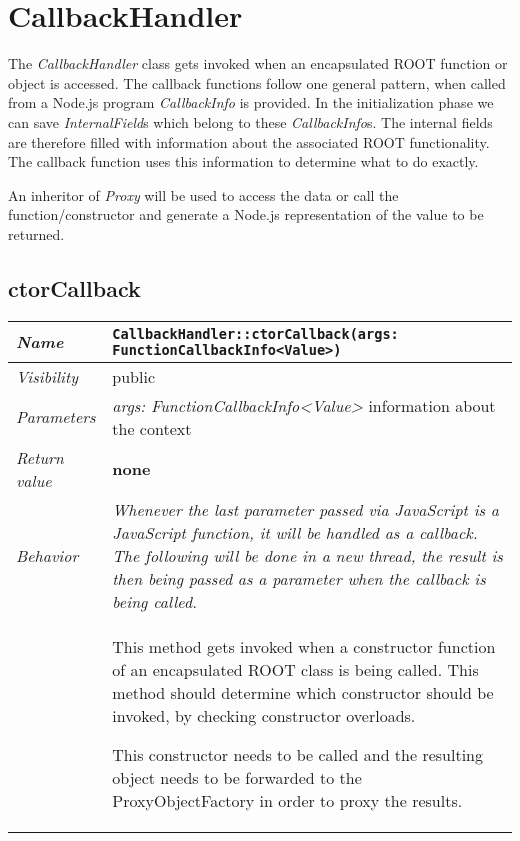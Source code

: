 \chapter{CallbackHandler}
The \textit{CallbackHandler} class gets invoked when an encapsulated ROOT function or object is accessed.
The callback functions follow one general pattern, when called from a Node.js program \textit{CallbackInfo} is provided.
In the initialization phase we can save \textit{InternalField}s which belong to these \textit{CallbackInfo}s.
The internal fields are therefore filled with information about the associated ROOT functionality.
The callback function uses this information to determine what to do exactly.

An inheritor of \textit{Proxy} will be used to access the data or call the function/constructor and generate a Node.js representation of the value to be returned.
\section{ctorCallback}
\begin{longtable}{p{3cm} @{\hskip 1cm} p{12cm}}
 \hline
\textit{Name} & \texttt{CallbackHandler::ctorCallback(args: FunctionCallbackInfo<Value>)}\\
\hline
 \textit{Visibility} & public\\
\hline
\textit{Parameters} & \textit{args: FunctionCallbackInfo<Value>} information about the context\\
\hline
\textit{Return value} & \textbf{none}\\
  \hline
 \textit{Behavior} &
 \textit{Whenever the last parameter passed via JavaScript is a JavaScript function, it will be handled as a callback. The following will be done in a new thread, the result is then being passed as a parameter when the callback is being called.}\\

 & This method gets invoked when a constructor function of an encapsulated ROOT class is being called.
 This method should determine which constructor should be invoked, by checking constructor overloads.

 This constructor needs to be called and the resulting object needs to be forwarded to the ProxyObjectFactory in order to proxy the results.\\
\hline
\end{longtable}
